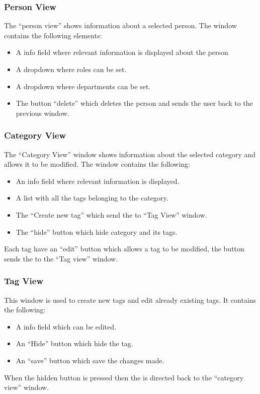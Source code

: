 \subsubsection{Person View}
The ``person view'' shows information about a selected person.
The window contains the following elements:
\begin{itemize}
	\item A info field where relevant information is displayed about the person
	\item A dropdown where roles can be set.
	\item A dropdown where departments can be set.
	\item The button ``delete'' which deletes the person and sends the user back to the previous window. 
\end{itemize}

\subsubsection{Category View}
The ``Category View'' window shows information about the selected category and allows it to be modified. The window contains the following: 

\begin{itemize}
	\item An info field where relevant information is displayed.
	\item A list with all the tags belonging to the category.
	\item The ``Create new tag'' which send the \admin[] to ``Tag View'' window.
	\item The ``hide'' button which hide category and its tags. 
\end{itemize}
Each tag have an ``edit'' button which allows a tag to be modified, the button sends the \admin to the ``Tag view'' window. 

\subsubsection{Tag View}
This window is used to create new tags and edit already existing tags.
It contains the following:
\begin{itemize}
	\item A info field which can be edited.
	\item An ``Hide'' button which hide the tag.
	\item An ``save'' button which save the changes made.
\end{itemize}
When the hidden button is pressed then the \admin[] is directed back to the ``category view'' window.


